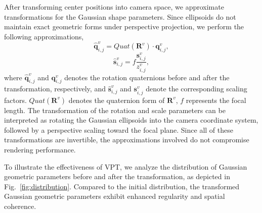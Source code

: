 \documentclass[lettersize,journal]{IEEEtran}
\begin{document}
After transforming center positions into camera space, we approximate transformations for the Gaussian shape parameters. Since ellipsoids do not maintain exact geometric forms under perspective projection, we perform the following approximations,
\begin{equation}
    \hat{\boldsymbol{q}}_{i,j}^{v}=Quat(\boldsymbol{R}^v)\cdot \boldsymbol{q}_{i,j}^v,
\end{equation}
\begin{equation}
    \hat{\boldsymbol{s}}_{i,j}^{v}=f\frac{\boldsymbol{s}_{i,j}^{v}}{z_{i,j}^{v}},
\end{equation}
where $\hat{\boldsymbol{q}}_{i,j}^{v}$ and $\boldsymbol{q}_{i,j}^v$ denotes the rotation quaternions before and after the transformation, respectively, and $\hat{\boldsymbol{s}}_{i,j}^{v}$ and $\boldsymbol{s}_{i,j}^v$ denote the corresponding scaling factors. $Quat(\boldsymbol{R}^v)$ denotes the quaternion form of $\boldsymbol{R}^v$, $f$ represents the focal length.
The transformation of the rotation and scale parameters can be interpreted as rotating the Gaussian ellipsoids into the camera coordinate system, followed by a perspective scaling toward the focal plane.
Since all of these transformations are invertible, the approximations involved do not compromise rendering performance. 

To illustrate the effectiveness of VPT, we analyze the distribution of Gaussian geometric parameters before and after the transformation, as depicted in Fig.~\ref{fig:distribution}. Compared to the initial distribution, the transformed Gaussian geometric parameters exhibit enhanced regularity and spatial coherence.

\end{document}
